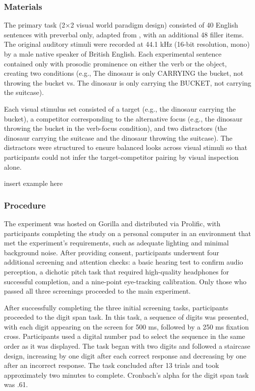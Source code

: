 \subsubsection{Materials}

The primary task (2×2 visual world paradigm design) consisted of 40 English sentences with preverbal only, adapted from \cite{Ge_etal_2021}, with an additional 48 filler items. The original auditory stimuli were recorded at 44.1 kHz (16-bit resolution, mono) by a male native speaker of British English. Each experimental sentence contained only with prosodic prominence on either the verb or the object, creating two conditions (e.g., The dinosaur is only CARRYING the bucket, not throwing the bucket vs. The dinosaur is only carrying the BUCKET, not carrying the suitcase). 

Each visual stimulus set consisted of a target (e.g., the dinosaur carrying the bucket), a competitor corresponding to the alternative focus (e.g., the dinosaur throwing the bucket in the verb-focus condition), and two distractors (the dinosaur carrying the suitcase and the dinosaur throwing the suitcase). The distractors were structured to ensure balanced looks across visual stimuli so that participants could not infer the target-competitor pairing by visual inspection alone.

insert example here

\subsubsection{Procedure}

The experiment was hosted on Gorilla \citep{Anwyl-Irvine_2019} and distributed via Prolific, with participants completing the study on a personal computer in an environment that met the experiment’s requirements, such as adequate lighting and minimal background noise. After providing consent, participants underwent four additional screening and attention checks: a basic hearing test to confirm audio perception, a dichotic pitch task \citep{milne_2021} that required high-quality headphones for successful completion, and a nine-point eye-tracking calibration. Only those who passed all three screenings proceeded to the main experiment.

After successfully completing the three initial screening tasks, participants proceeded to the digit span task. In this task, a sequence of digits was presented, with each digit appearing on the screen for 500 ms, followed by a 250 ms fixation cross. Participants used a digital number pad to select the sequence in the same order as it was displayed. The task began with two digits and followed a staircase design, increasing by one digit after each correct response and decreasing by one after an incorrect response. The task concluded after 13 trials and took approximately two minutes to complete. Cronbach’s alpha for the digit span task was .61.

